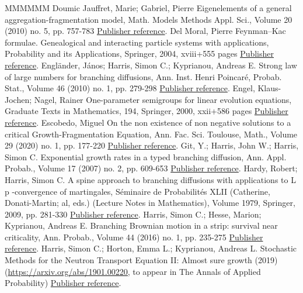 \begin{thebibliography}{MMMMMM}
 Doumic Jauffret, Marie; Gabriel, Pierre Eigenelements of a general aggregation-fragmentation model, Math. Models Methods Appl. Sci., Volume 20 (2010) no. 5, pp. 757-783 \href{https://ahl.centre-mersenne.org/item/AHL_2020__3__795_0/#DoumGab}{Publisher reference}.
 Del Moral, Pierre Feynman–Kac formulae. Genealogical and interacting particle systems with applications, Probability and its Applications, Springer, 2004, xviii+555 pages \href{https://ahl.centre-mersenne.org/item/AHL_2020__3__795_0/#Delmoral}{Publisher reference}.
 Engländer, János; Harris, Simon C.; Kyprianou, Andreas E. Strong law of large numbers for branching diffusions, Ann. Inst. Henri Poincaré, Probab. Stat., Volume 46 (2010) no. 1, pp. 279-298 \href{https://ahl.centre-mersenne.org/item/AHL_2020__3__795_0/#EnHaKy}{Publisher reference}.
 Engel, Klaus-Jochen; Nagel, Rainer One-parameter semigroups for linear evolution equations, Graduate Texts in Mathematics, 194, Springer, 2000, xxii+586 pages \href{https://ahl.centre-mersenne.org/item/AHL_2020__3__795_0/#EN00}{Publisher reference}.
 Escobedo, Miguel On the non existence of non negative solutions to a critical Growth-Fragmentation Equation, Ann. Fac. Sci. Toulouse, Math., Volume 29 (2020) no. 1, pp. 177-220 \href{https://ahl.centre-mersenne.org/item/AHL_2020__3__795_0/#Esco}{Publisher reference}.
 Git, Y.; Harris, John W.; Harris, Simon C. Exponential growth rates in a typed branching diffusion, Ann. Appl. Probab., Volume 17 (2007) no. 2, pp. 609-653 \href{https://ahl.centre-mersenne.org/item/AHL_2020__3__795_0/#GiHaHa}{Publisher reference}.
 Hardy, Robert; Harris, Simon C. A spine approach to branching diffusions with applications to L p -convergence of martingales, Séminaire de Probabilités XLII (Catherine, Donati-Martin; al, eds.) (Lecture Notes in Mathematics), Volume 1979, Springer, 2009, pp. 281-330 \href{https://ahl.centre-mersenne.org/item/AHL_2020__3__795_0/#HaHa}{Publisher reference}.
 Harris, Simon C.; Hesse, Marion; Kyprianou, Andreas E. Branching Brownian motion in a strip: survival near criticality, Ann. Probab., Volume 44 (2016) no. 1, pp. 235-275 \href{https://ahl.centre-mersenne.org/item/AHL_2020__3__795_0/#HaHeKy}{Publisher reference}.
 Harris, Simon C.; Horton, Emma L.; Kyprianou, Andreas L. Stochastic Methods for the Neutron Transport Equation II: Almost sure growth (2019) (\url{https://arxiv.org/abs/1901.00220,} to appear in The Annals of Applied Probability) \href{https://ahl.centre-mersenne.org/item/AHL_2020__3__795_0/#HHK}{Publisher reference}.

\end{thebibliography}

